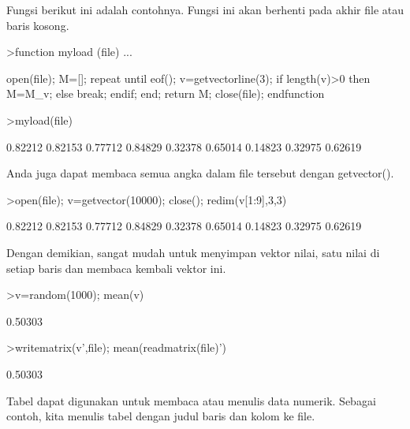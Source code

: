 \documentclass[12pt,Times new roman,letterpaper]{book}
\begin{document}
\begin{eulernootebook}
\begin{eulercomment}
\begin{eulercomment}
\begin{eulernootebook}
\begin{eulercomment}
\begin{eulercomment}
\begin{eulercomment}
\begin{eulercomment}
\begin{eulercomment}
\begin{eulercomment}
\begin{eulercomment}
\begin{eulercomment}
\begin{eulercomment}
\begin{eulercomment}
\begin{eulercomment}
\begin{eulercomment}
\begin{eulercomment}
\begin{eulercomment}
Fungsi berikut ini adalah contohnya. Fungsi ini akan berhenti pada
akhir file atau baris kosong.
\end{eulercomment}
\begin{eulerprompt}
>function myload (file) ...
\end{eulerprompt}
\begin{eulerudf}
  open(file);
  M=[];
  repeat
     until eof();
     v=getvectorline(3);
     if length(v)>0 then M=M_v; else break; endif;
  end;
  return M;
  close(file);
  endfunction
\end{eulerudf}
\begin{eulerprompt}
>myload(file)
\end{eulerprompt}
\begin{euleroutput}
    0.82212   0.82153   0.77712 
    0.84829   0.32378   0.65014 
    0.14823   0.32975   0.62619 
\end{euleroutput}
\begin{eulercomment}
Anda juga dapat membaca semua angka dalam file tersebut dengan
getvector().
\end{eulercomment}
\begin{eulerprompt}
>open(file); v=getvector(10000); close(); redim(v[1:9],3,3)
\end{eulerprompt}
\begin{euleroutput}
    0.82212   0.82153   0.77712 
    0.84829   0.32378   0.65014 
    0.14823   0.32975   0.62619 
\end{euleroutput}
\begin{eulercomment}
Dengan demikian, sangat mudah untuk menyimpan vektor nilai, satu nilai
di setiap baris dan membaca kembali vektor ini.
\end{eulercomment}
\begin{eulerprompt}
>v=random(1000); mean(v)
\end{eulerprompt}
\begin{euleroutput}
  0.50303
\end{euleroutput}
\begin{eulerprompt}
>writematrix(v',file); mean(readmatrix(file)')
\end{eulerprompt}
\begin{euleroutput}
  0.50303
\end{euleroutput}
\begin{eulercomment}
Tabel dapat digunakan untuk membaca atau menulis data numerik. Sebagai
contoh, kita menulis tabel dengan judul baris dan kolom ke file.
\end{eulercomment}

\end{eulercomment}
\end{eulercomment}
\end{eulercomment}
\end{eulercomment}
\end{eulercomment}
\end{eulercomment}
\end{eulercomment}
\end{eulercomment}
\end{eulercomment}
\end{eulercomment}
\end{eulercomment}
\end{eulercomment}
\end{eulercomment}
\end{eulernootebook}
\end{eulercomment}
\end{eulercomment}
\end{eulernootebook}
\end{document}
